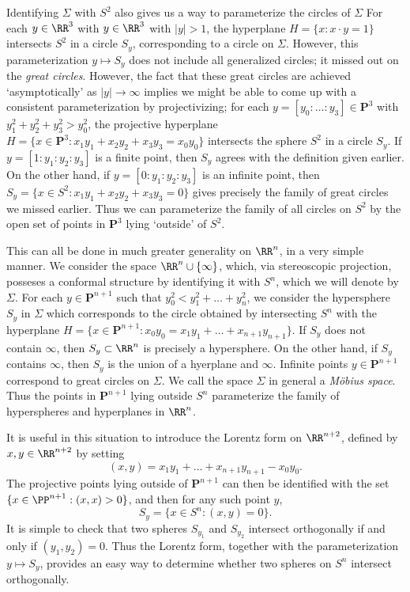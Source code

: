 Identifying $\Sigma$ with $S^2$ also gives us a way to parameterize the circles of $\Sigma$ For each $y \in \RR^3$ with $y \in \RR^3$ with $|y| > 1$, the hyperplane $H = \{ x : x \cdot y = 1 \}$ intersects $S^2$ in a circle $S_y$, corresponding to a circle on $\Sigma$. However, this parameterization $y \mapsto S_y$ does not include all generalized circles; it missed out on the \emph{great circles}. However, the fact that these great circles are achieved `asymptotically' as $|y| \to \infty$ implies we might be able to come up with a consistent parameterization by projectivizing; for each $y = [y_0: \dots : y_3] \in \mathbf{P}^3$ with $y_1^2 + y_2^2 + y_3^2 > y_0^2$, the projective hyperplane $H = \{ x \in \mathbf{P}^3: x_1y_1 + x_2y_2 + x_3y_3 = x_0y_0 \}$ intersects the sphere $S^2$ in a circle $S_y$. If $y = [1:y_1:y_2:y_3]$ is a finite point, then $S_y$ agrees with the definition given earlier. On the other hand, if $y = [0:y_1:y_2:y_3]$ is an infinite point, then $S_y = \{ x \in S^2 : x_1y_1 + x_2y_2 + x_3y_3 = 0 \}$ gives precisely the family of great circles we missed earlier. Thus we can parameterize the family of all circles on $S^2$ by the open set of points in $\mathbf{P}^3$ lying `outside' of $S^2$.

This can all be done in much greater generality on $\RR^n$, in a very simple manner. We consider the space $\RR^n \cup \{ \infty \}$, which, via stereoscopic projection, posseses a conformal structure by identifying it with $S^n$, which we will denote by $\Sigma$. For each $y \in \mathbf{P}^{n+1}$ such that $y_0^2 < y_1^2 + \dots + y_n^2$, we consider the hypersphere $S_y$ in $\Sigma$ which corresponds to the circle obtained by intersecting $S^n$ with the hyperplane $H = \{ x \in \mathbf{P}^{n+1} : x_0y_0 = x_1y_1 + \dots + x_{n+1}y_{n+1} \}$. If $S_y$ does not contain $\infty$, then $S_y \subset \RR^n$ is precisely a hypersphere. On the other hand, if $S_y$ contains $\infty$, then $S_y$ is the union of a hyerplane and $\infty$. Infinite points $y \in \mathbf{P}^{n+1}$ correspond to great circles on $\Sigma$. We call the space $\Sigma$ in general a \emph{M\"{o}bius space}. Thus the points in $\mathbf{P}^{n+1}$ lying outside $S^n$ parameterize the family of hyperspheres and hyperplanes in $\RR^n$.

It is useful in this situation to introduce the Lorentz form on $\RR^{n+2}$, defined by $x,y \in \RR^{n+2}$ by setting
%
\[ (x,y) = x_1 y_1 + \dots + x_{n+1} y_{n+1} - x_0 y_0. \]
%
The projective points lying outside of $\mathbf{P}^{n+1}$ can then be identified with the set $\{ x \in \PP^{n+1} : (x,x) > 0 \}$, and then for any such point $y$,
%
\[ S_y = \{ x \in S^n : (x,y) = 0 \}. \]
%
It is simple to check that two spheres $S_{y_1}$ and $S_{y_2}$ intersect orthogonally if and only if $(y_1,y_2) = 0$. Thus the Lorentz form, together with the parameterization $y \mapsto S_y$, provides an easy way to determine whether two spheres on $S^n$ intersect orthogonally.

